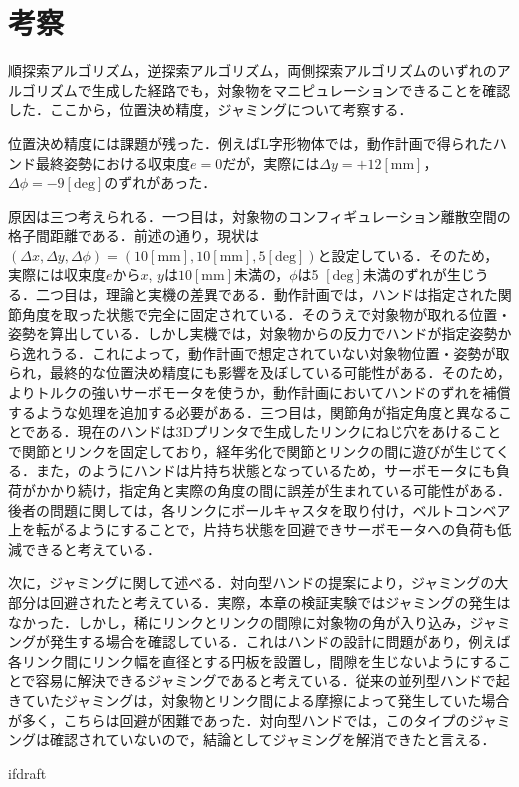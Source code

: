\documentclass[a4paper,twoside,12pt,papersize, dvipdfmx]{iirthesis}
\begin{document}
\section{考察} \label{sec::result::consideration}
順探索アルゴリズム，逆探索アルゴリズム，両側探索アルゴリズムのいずれのアルゴリズムで生成した経路でも，対象物をマニピュレーションできることを確認した．ここから，位置決め精度，ジャミングについて考察する．\par
位置決め精度には課題が残った．例えばL字形物体では，動作計画で得られたハンド最終姿勢における収束度$e=0$だが，実際には$\Delta y = +12 \mathrm{[mm]}$，$\Delta \phi = -9 \mathrm{[deg]}$のずれがあった．\par
原因は三つ考えられる．一つ目は，対象物のコンフィギュレーション離散空間の格子間距離である．前述の通り，現状は$(\Delta x, \Delta y, \Delta \phi) = (10 \mathrm{[mm]}, 10 \mathrm{[mm]}, 5 \mathrm{[deg]})$と設定している．そのため，実際には収束度$e$から$x$, $y$は$10 \mathrm{[mm]}$未満の，$\phi$は5 $\mathrm{[deg]}$未満のずれが生じうる．二つ目は，理論と実機の差異である．動作計画では，ハンドは指定された関節角度を取った状態で完全に固定されている．そのうえで対象物が取れる位置・姿勢を算出している．しかし実機では，対象物からの反力でハンドが指定姿勢から逸れうる．これによって，動作計画で想定されていない対象物位置・姿勢が取られ，最終的な位置決め精度にも影響を及ぼしている可能性がある．そのため，よりトルクの強いサーボモータを使うか，動作計画においてハンドのずれを補償するような処理を追加する必要がある．三つ目は，関節角が指定角度と異なることである．現在のハンドは3Dプリンタで生成したリンクにねじ穴をあけることで関節とリンクを固定しており，経年劣化で関節とリンクの間に遊びが生じてくる．また，\figref{}のようにハンドは片持ち状態となっているため，サーボモータにも負荷がかかり続け，指定角と実際の角度の間に誤差が生まれている可能性がある．後者の問題に関しては，各リンクにボールキャスタを取り付け，ベルトコンベア上を転がるようにすることで，片持ち状態を回避できサーボモータへの負荷も低減できると考えている．\par

次に，ジャミングに関して述べる．対向型ハンドの提案により，ジャミングの大部分は回避されたと考えている．実際，本章の検証実験ではジャミングの発生はなかった．しかし，稀にリンクとリンクの間隙に対象物の角が入り込み，ジャミングが発生する場合を確認している．これはハンドの設計に問題があり，例えば各リンク間にリンク幅を直径とする円板を設置し，間隙を生じないようにすることで容易に解決できるジャミングであると考えている．従来の並列型ハンドで起きていたジャミングは，対象物とリンク間による摩擦によって発生していた場合が多く，こちらは回避が困難であった．対向型ハンドでは，このタイプのジャミングは確認されていないので，結論としてジャミングを解消できたと言える．




\expandafter\ifx\csname ifdraft\endcsname\relax
    
\end{document}
